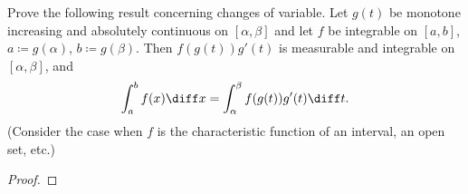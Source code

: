 \begin{problem}
Prove the following result concerning changes of variable. Let $g(t)$ be
monotone increasing and absolutely continuous on $[\alpha,\beta]$ and let $f$
be integrable on $[a,b]$, $a\coloneqq g(\alpha)$, $b\coloneqq
g(\beta)$. Then $f(g(t))g'(t)$ is measurable and integrable on
$[\alpha,\beta]$, and
\[
\int_a^b f(x)\diff x=\int_\alpha^\beta f(g(t))g'(t)\diff t.
\]
(Consider the case when $f$ is the characteristic function of an interval,
an open set, etc.)
\end{problem}
\begin{proof}
\end{proof}

